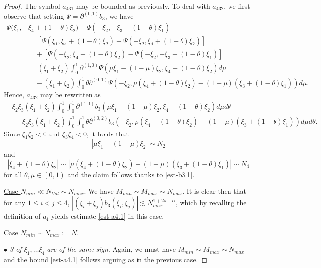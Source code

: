 \documentclass{amsart}
\theoremstyle{definition}
\theoremstyle{remark}
\numberwithin{equation}{section}
\begin{document}
\begin{proof}
    The symbol $a_{431}$ may be bounded as previously. To deal with $a_{432}$, we first observe that setting $\Psi= \partial^{(0,1)}b_3$, we have
    \begin{align*}
      \Psi(\xi_1, &\xi_4+(1-\theta)\xi_2) - \Psi(-\xi_2, -\xi_3-(1-\theta)\xi_1) \\
      &=
       [ \Psi(\xi_1, \xi_4+(1-\theta)\xi_2) - \Psi(-\xi_2, \xi_4+(1-\theta)\xi_2) ]\\
      &\quad + [ \Psi(-\xi_2, \xi_4+(1-\theta)\xi_2) - \Psi(-\xi_2, -\xi_3-(1-\theta)\xi_1) ]\\
      &= (\xi_1+\xi_2)\int_0^1 \partial^{(1,0)}\Psi(\mu\xi_1-(1-\mu)\xi_2, \xi_4+(1-\theta)\xi_2)d\mu \\
      &\quad - (\xi_1+\xi_2)\int_0^1 \theta \partial^{(0,1)}\Psi(-\xi_2, \mu(\xi_4+(1-\theta)\xi_2) - (1-\mu)(\xi_3+(1-\theta)\xi_1)) d\mu .
    \end{align*} 
    Hence, $a_{432}$ may be rewritten as    
    \begin{align*}
     & \xi_2\xi_3(\xi_1+\xi_2) \int_0^1\int_0^1 \partial^{(1,1)}b_3(\mu\xi_1-(1-\mu)\xi_2, \xi_4+(1-\theta)\xi_2) d\mu d\theta \\
     &\ -\xi_2\xi_3(\xi_1+\xi_2)\int_0^1\int_0^1 \theta\partial^{(0,2)}b_3(-\xi_2, \mu(\xi_4+(1-\theta)\xi_2) - (1-\mu)(\xi_3+(1-\theta)\xi_1)) d\mu d\theta. 
    \end{align*}
    Since $\xi_1\xi_2<0$ and $\xi_3\xi_4<0$, it holds that 
    $$
    |\mu\xi_1-(1-\mu)\xi_2| \sim N_2
    $$
    and 
    $$
    |\xi_4+(1-\theta)\xi_2| \sim |\mu(\xi_4+(1-\theta)\xi_2) - (1-\mu)(\xi_3+(1-\theta)\xi_1)| \sim N_4
    $$
    for all $\theta,\mu\in (0,1)$ and the claim follows thanks to \eqref{est-b3.1}.    
    \noindent
    
  \underline{Case $N_{min}\ll N_{thd} \sim N_{max}$}. We have $M_{min}\sim M_{max}\sim N_{max}$. It is clear then that for any $1 \le i<j \le 4$, $|(\xi_i+\xi_j)b_3(\xi_i,\xi_j)|\lesssim N_{max}^{1+2s-\alpha}$, which by recalling the definition of $a_4$ yields estimate \eqref{est-a4.1} in this case. 
  
  \noindent
  \underline{Case $N_{min} \sim N_{max}:= N$}.
  
 \noindent
  \textit{$\bullet$ 3 of $\xi_1,\ldots \xi_4$ are of the same sign}. Again, we must have $M_{min}\sim M_{max}\sim N_{max}$ and the bound \eqref{est-a4.1} follows arguing as in the previous case.
  

\end{proof}
\end{document}
